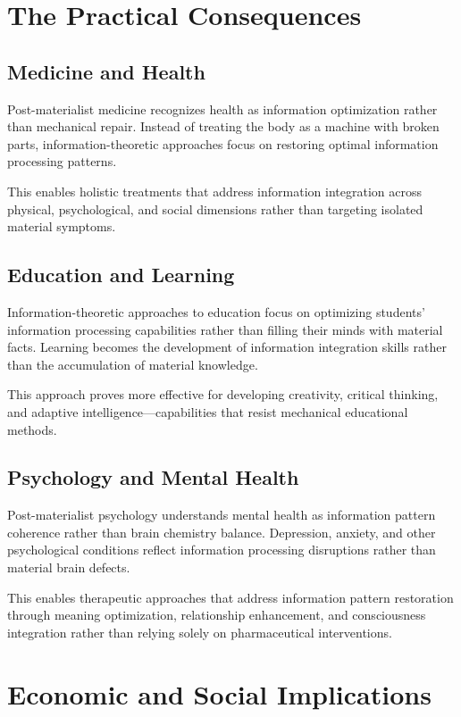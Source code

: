 \documentclass[12pt]{article}
\begin{document}
\section{The Practical Consequences}

\subsection{Medicine and Health}

Post-materialist medicine recognizes health as information optimization rather than mechanical repair. Instead of treating the body as a machine with broken parts, information-theoretic approaches focus on restoring optimal information processing patterns.

This enables holistic treatments that address information integration across physical, psychological, and social dimensions rather than targeting isolated material symptoms.

\subsection{Education and Learning}

Information-theoretic approaches to education focus on optimizing students' information processing capabilities rather than filling their minds with material facts. Learning becomes the development of information integration skills rather than the accumulation of material knowledge.

This approach proves more effective for developing creativity, critical thinking, and adaptive intelligence—capabilities that resist mechanical educational methods.

\subsection{Psychology and Mental Health}

Post-materialist psychology understands mental health as information pattern coherence rather than brain chemistry balance. Depression, anxiety, and other psychological conditions reflect information processing disruptions rather than material brain defects.

This enables therapeutic approaches that address information pattern restoration through meaning optimization, relationship enhancement, and consciousness integration rather than relying solely on pharmaceutical interventions.

\section{Economic and Social Implications}
\end{document}
